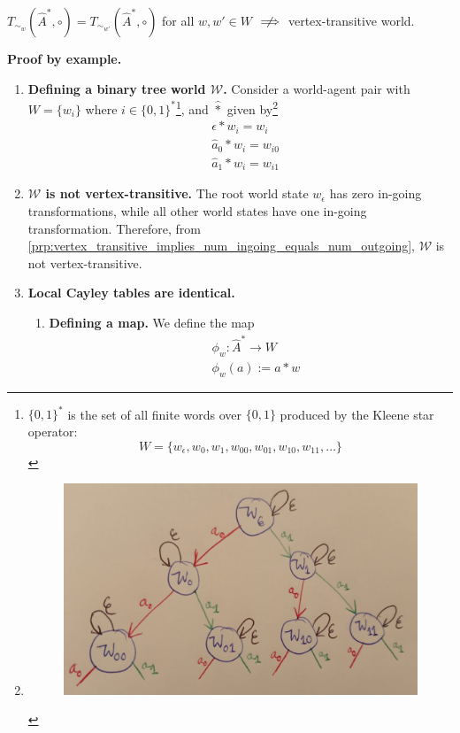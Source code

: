\begin{propositionE}
     $T_{\sim_{w}}(\hat{A}^{*}, \circ) = T_{\sim_{w'}}(\hat{A}^{*}, \circ)$ for all $w, w' \in W$ $\centernot\implies$ vertex-transitive world.
\end{propositionE}
\begin{proofE}
\textbf{Proof by example.}
\begin{enumerate}
    \item \textbf{Defining a binary tree world $\mathscr{W}$.}
    Consider a world-agent pair with $W = \{w_{i}\}$ where $i \in \{0, 1\}^{*}$\footnote{
    $\{0, 1\}^{*}$ is the set of all finite words over $\{0, 1\}$ produced by the Kleene star operator:
    \begin{equation}
        W = \{ w_{\epsilon}, w_{0}, w_{1}, w_{00}, w_{01}, w_{10}, w_{11}, \dots \}
    \end{equation}
    }, and $\hat{\ast}$ given by\footnote{
    \begin{figure}[H]
        \includegraphics[width=0.5\linewidth]{6BeyondSBDRLLocalAlgebras/Images/binary_tree_world.jpeg}
        \caption{}
    \end{figure}
    }
    \begin{align}
        & \epsilon \ast w_{i} = w_{i} \\
        & \hat{a}_{0} \ast w_{i} = w_{i0} \\
        & \hat{a}_{1} \ast w_{i} = w_{i1}
    \end{align}

    \item \textbf{$\mathscr{W}$ is not vertex-transitive.}
    The root world state $w_{\epsilon}$ has zero in-going transformations, while all other world states have one in-going transformation.
    Therefore, from \cref{prp:vertex_transitive_implies_num_ingoing_equals_num_outgoing}, $\mathscr{W}$ is not vertex-transitive.

    \item \textbf{Local Cayley tables are identical.}
    \begin{enumerate}
        \item \textbf{Defining a map.}
        We define the map
        \begin{align}
            & \phi_{w}: \hat{A}^{*} \to W \\
            & \phi_{w}(a) := a \ast w
        \end{align}


\end{enumerate}
\end{enumerate}
\end{proofE}
